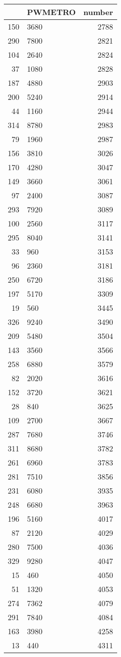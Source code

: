 \begin{table}[ht]
\centering
\begin{tabular}{rlr}
  \hline
 & PWMETRO & number \\ 
  \hline
150 & 3680 & 2788 \\ 
  290 & 7800 & 2821 \\ 
  104 & 2640 & 2824 \\ 
  37 & 1080 & 2828 \\ 
  187 & 4880 & 2903 \\ 
  200 & 5240 & 2914 \\ 
  44 & 1160 & 2944 \\ 
  314 & 8780 & 2983 \\ 
  79 & 1960 & 2987 \\ 
  156 & 3810 & 3026 \\ 
  170 & 4280 & 3047 \\ 
  149 & 3660 & 3061 \\ 
  97 & 2400 & 3087 \\ 
  293 & 7920 & 3089 \\ 
  100 & 2560 & 3117 \\ 
  295 & 8040 & 3141 \\ 
  33 & 960 & 3153 \\ 
  96 & 2360 & 3181 \\ 
  250 & 6720 & 3186 \\ 
  197 & 5170 & 3309 \\ 
  19 & 560 & 3445 \\ 
  326 & 9240 & 3490 \\ 
  209 & 5480 & 3504 \\ 
  143 & 3560 & 3566 \\ 
  258 & 6880 & 3579 \\ 
  82 & 2020 & 3616 \\ 
  152 & 3720 & 3621 \\ 
  28 & 840 & 3625 \\ 
  109 & 2700 & 3667 \\ 
  287 & 7680 & 3746 \\ 
  311 & 8680 & 3782 \\ 
  261 & 6960 & 3783 \\ 
  281 & 7510 & 3856 \\ 
  231 & 6080 & 3935 \\ 
  248 & 6680 & 3963 \\ 
  196 & 5160 & 4017 \\ 
  87 & 2120 & 4029 \\ 
  280 & 7500 & 4036 \\ 
  329 & 9280 & 4047 \\ 
  15 & 460 & 4050 \\ 
  51 & 1320 & 4053 \\ 
  274 & 7362 & 4079 \\ 
  291 & 7840 & 4084 \\ 
  163 & 3980 & 4258 \\ 
  13 & 440 & 4311 \\ 
   \hline
\end{tabular}
\end{table}
